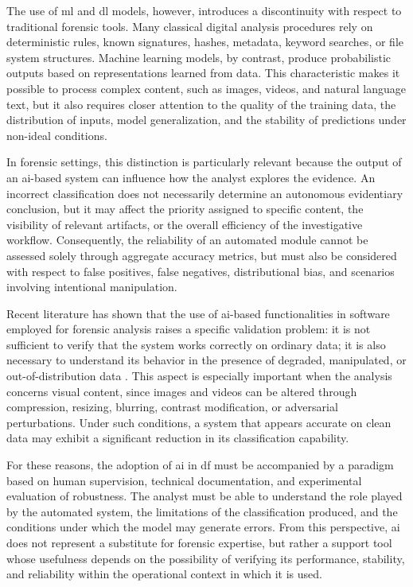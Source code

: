 The use of \gls{ml} and \gls{dl} models, however, introduces a discontinuity
with respect to traditional forensic tools. Many classical digital analysis
procedures rely on deterministic rules, known signatures, hashes, metadata,
keyword searches, or file system structures. Machine learning models, by
contrast, produce probabilistic outputs based on representations learned from
data. This characteristic makes it possible to process complex content, such as
images, videos, and natural language text, but it also requires closer
attention to the quality of the training data, the distribution of inputs,
model generalization, and the stability of predictions under non-ideal
conditions.

In forensic settings, this distinction is particularly relevant because the
output of an \gls{ai}-based system can influence how the analyst explores the
evidence. An incorrect classification does not necessarily determine an
autonomous evidentiary conclusion, but it may affect the priority assigned to
specific content, the visibility of relevant artifacts, or the overall
efficiency of the investigative workflow. Consequently, the reliability of an
automated module cannot be assessed solely through aggregate accuracy metrics,
but must also be considered with respect to false positives, false negatives,
distributional bias, and scenarios involving intentional manipulation.

Recent literature has shown that the use of \gls{ai}-based functionalities in
software employed for forensic analysis raises a specific validation problem:
it is not sufficient to verify that the system works correctly on ordinary
data; it is also necessary to understand its behavior in the presence of
degraded, manipulated, or out-of-distribution data
\cite{sanna2024preliminary,sanna2025pixelperfect}. This aspect is especially
important when the analysis concerns visual content, since images and videos
can be altered through compression, resizing, blurring, contrast modification,
or adversarial perturbations. Under such conditions, a system that appears
accurate on clean data may exhibit a significant reduction in its
classification capability.

For these reasons, the adoption of \gls{ai} in \gls{df} must be accompanied by
a paradigm based on human supervision, technical documentation, and experimental
evaluation of robustness. The analyst must be able to understand the role
played by the automated system, the limitations of the classification produced,
and the conditions under which the model may generate errors. From this
perspective, \gls{ai} does not represent a substitute for forensic expertise,
but rather a support tool whose usefulness depends on the possibility of
verifying its performance, stability, and reliability within the operational
context in which it is used.

